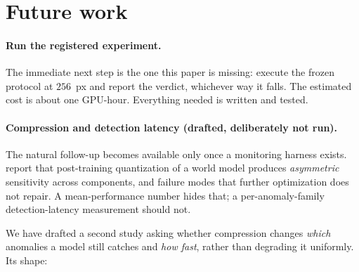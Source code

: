 \section{Future work}
\label{sec:future}

\paragraph{Run the registered experiment.}
The immediate next step is the one this paper is missing: execute the frozen
protocol at $256$~px and report the verdict, whichever way it falls. The
estimated cost is about one GPU-hour. Everything needed is written and tested.

\paragraph{Compression and detection latency (drafted, deliberately not run).}
The natural follow-up becomes available only once a monitoring harness exists.
\citet{fu2026quantization} report that post-training quantization of a world
model produces \emph{asymmetric} sensitivity across components, and failure
modes that further optimization does not repair. A mean-performance number hides
that; a per-anomaly-family detection-latency measurement should not.

We have drafted a second study asking whether compression changes \emph{which}
anomalies a model still catches and \emph{how fast}, rather than degrading it
uniformly. Its shape:


